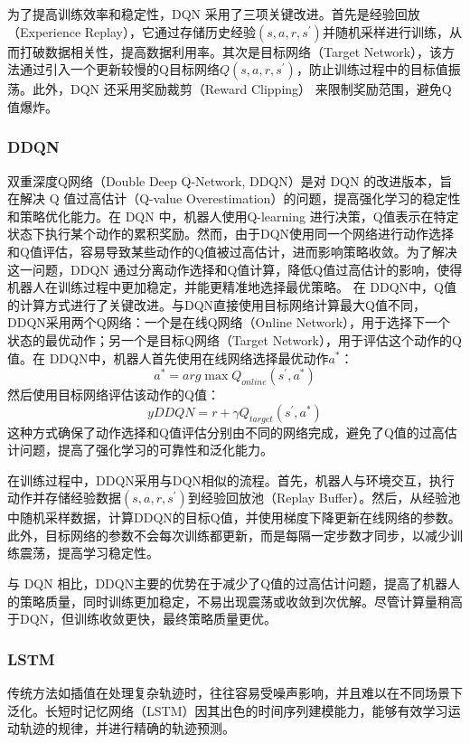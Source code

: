 为了提高训练效率和稳定性，DQN 采用了三项关键改进。首先是经验回放（Experience Replay），它通过存储历史经验$(s,a,r,s^{\prime})$并随机采样进行训练，从而打破数据相关性，提高数据利用率。其次是目标网络（Target Network），该方法通过引入一个更新较慢的Q目标网络$Q(s,a,r,s^{\prime})$，防止训练过程中的目标值振荡。此外，DQN 还采用奖励裁剪（Reward Clipping） 来限制奖励范围，避免Q值爆炸。

\subsubsection{DDQN}
双重深度Q网络（Double Deep Q-Network, DDQN）是对 DQN 的改进版本，旨在解决 Q 值过高估计（Q-value Overestimation）的问题，提高强化学习的稳定性和策略优化能力。在 DQN 中，机器人使用Q-learning 进行决策，Q值表示在特定状态下执行某个动作的累积奖励。然而，由于DQN使用同一个网络进行动作选择和Q值评估，容易导致某些动作的Q值被过高估计，进而影响策略收敛。为了解决这一问题，DDQN 通过分离动作选择和Q值计算，降低Q值过高估计的影响，使得机器人在训练过程中更加稳定，并能更精准地选择最优策略。
在 DDQN中，Q值的计算方式进行了关键改进。与DQN直接使用目标网络计算最大Q值不同，DDQN采用两个Q网络：一个是在线Q网络（Online Network），用于选择下一个状态的最优动作；另一个是目标Q网络（Target Network），用于评估这个动作的Q值。在 DDQN中，机器人首先使用在线网络选择最优动作$a^{*}$：
\begin{equation}
	\label{equ:DDQN1}
	a^{*} = arg\max Q_{online}(s^{\prime},a^{*})
\end{equation}
然后使用目标网络评估该动作的Q值：
\begin{equation}
	\label{equ:DDQN2}
	yDDQN = r + \gamma Q_{target}(s^{\prime},a^{*})
\end{equation}
这种方式确保了动作选择和Q值评估分别由不同的网络完成，避免了Q值的过高估计问题，提高了强化学习的可靠性和泛化能力。

在训练过程中，DDQN采用与DQN相似的流程。首先，机器人与环境交互，执行动作并存储经验数据$(s,a,r,s^{\prime})$到经验回放池（Replay Buffer）。然后，从经验池中随机采样数据，计算DDQN的目标Q值，并使用梯度下降更新在线网络的参数。此外，目标网络的参数不会每次训练都更新，而是每隔一定步数才同步，以减少训练震荡，提高学习稳定性。

与 DQN 相比，DDQN主要的优势在于减少了Q值的过高估计问题，提高了机器人的策略质量，同时训练更加稳定，不易出现震荡或收敛到次优解。尽管计算量稍高于DQN，但训练收敛更快，最终策略质量更优。

\subsubsection{LSTM}
传统方法如插值在处理复杂轨迹时，往往容易受噪声影响，并且难以在不同场景下泛化。长短时记忆网络（LSTM）因其出色的时间序列建模能力，能够有效学习运动轨迹的规律，并进行精确的轨迹预测。

